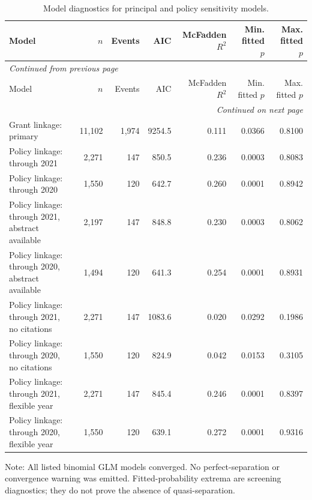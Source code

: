\documentclass[11pt]{article}
\begin{document}
\begin{longtable}{p{5.1cm}rrrrrr}
\caption{Model diagnostics for principal and policy sensitivity models.}\label{tab:s4-diagnostics}\\
\toprule
Model & $n$ & Events & AIC & McFadden $R^2$ & Min. fitted $p$ & Max. fitted $p$ \\
\midrule
\endfirsthead
\multicolumn{7}{l}{\small\itshape Continued from previous page} \\
\toprule
Model & $n$ & Events & AIC & McFadden $R^2$ & Min. fitted $p$ & Max. fitted $p$ \\
\midrule
\endhead
\midrule
\multicolumn{7}{r}{\small\itshape Continued on next page} \\
\endfoot
\bottomrule
\endlastfoot
Grant linkage: primary & 11,102 & 1,974 & 9254.5 & 0.111 & 0.0366 & 0.8100 \\
Policy linkage: through 2021 & 2,271 & 147 & 850.5 & 0.236 & 0.0003 & 0.8083 \\
Policy linkage: through 2020 & 1,550 & 120 & 642.7 & 0.260 & 0.0001 & 0.8942 \\
Policy linkage: through 2021, abstract available & 2,197 & 147 & 848.8 & 0.230 & 0.0003 & 0.8062 \\
Policy linkage: through 2020, abstract available & 1,494 & 120 & 641.3 & 0.254 & 0.0001 & 0.8931 \\
Policy linkage: through 2021, no citations & 2,271 & 147 & 1083.6 & 0.020 & 0.0292 & 0.1986 \\
Policy linkage: through 2020, no citations & 1,550 & 120 & 824.9 & 0.042 & 0.0153 & 0.3105 \\
Policy linkage: through 2021, flexible year & 2,271 & 147 & 845.4 & 0.246 & 0.0001 & 0.8397 \\
Policy linkage: through 2020, flexible year & 1,550 & 120 & 639.1 & 0.272 & 0.0001 & 0.9316 \\
\end{longtable}

\noindent\small Note: All listed binomial GLM models converged. No perfect-separation or convergence warning was emitted. Fitted-probability extrema are screening diagnostics; they do not prove the absence of quasi-separation.
\end{document}
